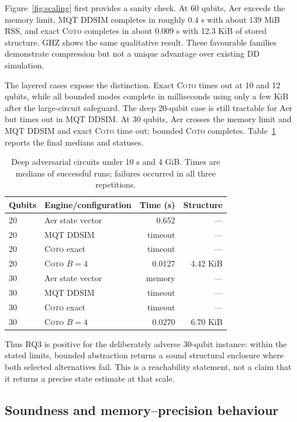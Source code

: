 \documentclass[sigconf,nonacm]{acmart}
\newcommand{\tool}{\textsc{Coto}}
\begin{document}
Figure~\ref{fig:scaling} first provides a sanity check. At 60 qubits, Aer exceeds the memory
limit, MQT DDSIM completes in roughly $0.4$ s with about 139 MiB RSS, and exact \tool{}
completes in about $0.009$ s with 12.3 KiB of stored structure. GHZ shows the same qualitative
result. These favourable families demonstrate compression but not a unique advantage over
existing DD simulation.

The layered cases expose the distinction. Exact \tool{} times out at 10 and 12 qubits, while
all bounded modes complete in milliseconds using only a few KiB after the large-circuit
safeguard. The deep 20-qubit case is still tractable for Aer but times out in MQT DDSIM. At 30
qubits, Aer crosses the memory limit and MQT DDSIM and exact \tool{} time out; bounded
\tool{} completes. Table~\ref{tab:deep} reports the final medians and statuses.

\begin{table}[t]
  \caption{Deep adversarial circuits under 10 s and 4 GiB. Times are medians of successful
  runs; failures occurred in all three repetitions.}
  \label{tab:deep}
  \centering
  \begin{tabular}{llrr}
    \toprule
    Qubits & Engine/configuration & Time (s) & Structure \\
    \midrule
    20 & Aer state vector & 0.652 & --- \\
    20 & MQT DDSIM & timeout & --- \\
    20 & \tool{} exact & timeout & --- \\
    20 & \tool{} $B=4$ & 0.0127 & 4.42 KiB \\
    30 & Aer state vector & memory & --- \\
    30 & MQT DDSIM & timeout & --- \\
    30 & \tool{} exact & timeout & --- \\
    30 & \tool{} $B=4$ & 0.0270 & 6.70 KiB \\
    \bottomrule
  \end{tabular}
\end{table}

Thus RQ3 is positive for the deliberately adverse 30-qubit instance: within the stated
limits, bounded abstraction returns a sound structural enclosure where both selected
alternatives fail. This is a reachability statement, not a claim that it returns a precise
state estimate at that scale.

\subsection{Soundness and memory--precision behaviour}
\end{document}
